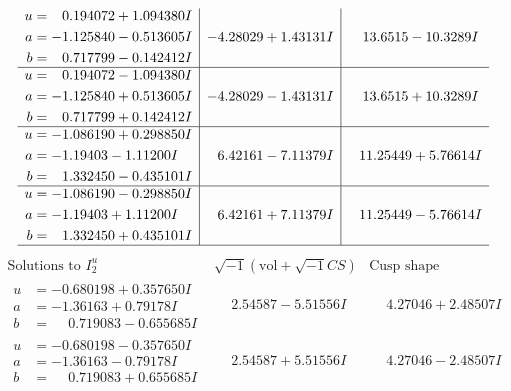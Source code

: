 \documentclass[1p]{elsarticle_modified}
\theoremstyle{definition}
\newcommand{\I}{\sqrt{-1}}
\begin{document}
$$\begin{array}{c|c|c}
\begin{aligned}
u &= \phantom{-}0.194072 + 1.094380 I \\
a &= -1.125840 - 0.513605 I \\
b &= \phantom{-}0.717799 - 0.142412 I\end{aligned}
 & -4.28029 + 1.43131 I & \phantom{-}13.6515 - 10.3289 I \\ \hline\begin{aligned}
u &= \phantom{-}0.194072 - 1.094380 I \\
a &= -1.125840 + 0.513605 I \\
b &= \phantom{-}0.717799 + 0.142412 I\end{aligned}
 & -4.28029 - 1.43131 I & \phantom{-}13.6515 + 10.3289 I \\ \hline\begin{aligned}
u &= -1.086190 + 0.298850 I \\
a &= -1.19403 - 1.11200 I \\
b &= \phantom{-}1.332450 - 0.435101 I\end{aligned}
 & \phantom{-}6.42161 - 7.11379 I & \phantom{-}11.25449 + 5.76614 I \\ \hline\begin{aligned}
u &= -1.086190 - 0.298850 I \\
a &= -1.19403 + 1.11200 I \\
b &= \phantom{-}1.332450 + 0.435101 I\end{aligned}
 & \phantom{-}6.42161 + 7.11379 I & \phantom{-}11.25449 - 5.76614 I\\
 \hline 
 \end{array}$$\newpage$$\begin{array}{c|c|c}  
\text{Solutions to }I^u_{2}& \I (\text{vol} + \sqrt{-1}CS) & \text{Cusp shape}\\
 \hline 
\begin{aligned}
u &= -0.680198 + 0.357650 I \\
a &= -1.36163 + 0.79178 I \\
b &= \phantom{-}0.719083 - 0.655685 I\end{aligned}
 & \phantom{-}2.54587 - 5.51556 I & \phantom{-}4.27046 + 2.48507 I \\ \hline\begin{aligned}
u &= -0.680198 - 0.357650 I \\
a &= -1.36163 - 0.79178 I \\
b &= \phantom{-}0.719083 + 0.655685 I\end{aligned}
 & \phantom{-}2.54587 + 5.51556 I & \phantom{-}4.27046 - 2.48507 I \\ \hline\begin{aligned}

\end{aligned}
\end{array}$$
\end{document}
